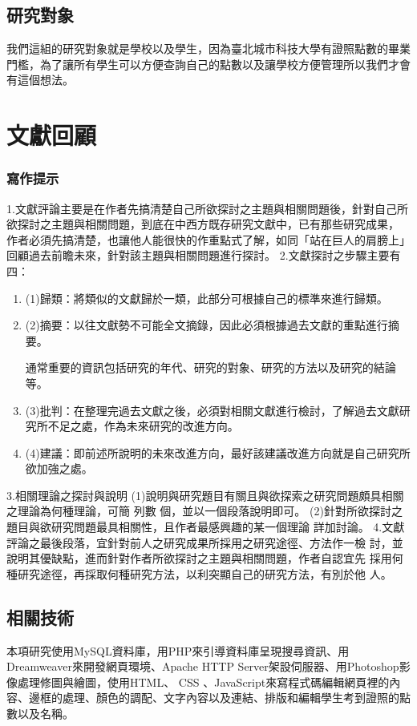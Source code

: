  \section{研究對象}
我們這組的研究對象就是學校以及學生，因為臺北城市科技大學有證照點數的畢業門檻，為了讓所有學生可以方便查詢自己的點數以及讓學校方便管理所以我們才會有這個想法。

\chapter{文獻回顧}

\subsection{寫作提示} 
1.文獻評論主要是在作者先搞清楚自己所欲探討之主題與相關問題後，針對自己所
欲探討之主題與相關問題，到底在中西方既存研究文獻中，已有那些研究成果，
作者必須先搞清楚，也讓他人能很快的作重點式了解，如同「站在巨人的肩膀上」
回顧過去前瞻未來，針對該主題與相關問題進行探討。
2.文獻探討之步驟主要有四：
\begin{enumerate}[noitemsep]
\item (1)歸類：將類似的文獻歸於一類，此部分可根據自己的標準來進行歸類。
\item (2)摘要：以往文獻勢不可能全文摘錄，因此必須根據過去文獻的重點進行摘要。

通常重要的資訊包括研究的年代、研究的對象、研究的方法以及研究的結論等。
\item (3)批判：在整理完過去文獻之後，必須對相關文獻進行檢討，了解過去文獻研究所不足之處，作為未來研究的改進方向。
\item (4)建議：即前述所說明的未來改進方向，最好該建議改進方向就是自己研究所欲加強之處。
\end{enumerate}

3.相關理論之探討與說明
(1)說明與研究題目有關且與欲探索之研究問題頗具相關之理論為何種理論，可簡
列數 個，並以一個段落說明即可。
(2)針對所欲探討之題目與欲研究問題最具相關性，且作者最感興趣的某一個理論
詳加討論。
4.文獻評論之最後段落，宜針對前人之研究成果所採用之研究途徑、方法作一檢
討，並說明其優缺點，進而針對作者所欲探討之主題與相關問題，作者自認宜先
採用何種研究途徑，再採取何種研究方法，以利突顯自己的研究方法，有別於他
人。

  \section{相關技術}
本項研究使用MySQL資料庫，用PHP來引導資料庫呈現搜尋資訊、用Dreamweaver來開發網頁環境、Apache HTTP Server架設伺服器、用Photoshop影像處理修圖與繪圖，使用HTML、 CSS 、JavaScript來寫程式碼編輯網頁裡的內容、邊框的處理、顏色的調配、文字內容以及連結、排版和編輯學生考到證照的點數以及名稱。

